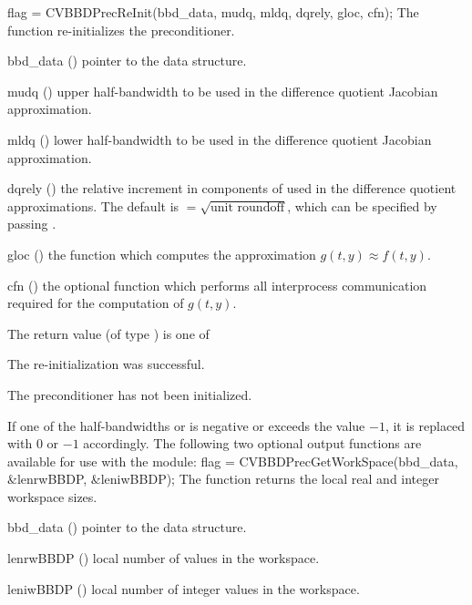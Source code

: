 {
  flag = CVBBDPrecReInit(bbd\_data, mudq, mldq, dqrely, gloc, cfn);
}
{
  The function  re-initializes the {\cvbbdpre} preconditioner.
}
{
  \begin{args}
  \item[bbd\_data] ()
    pointer to the {\cvbbdpre} data structure.
  \item[mudq] ()
    upper half-bandwidth to be used in the difference quotient Jacobian approximation.
  \item[mldq] ()
    lower half-bandwidth to be used in the difference quotient Jacobian approximation.
  \item[dqrely] ()
    the relative increment in components of  used in the difference quotient
    approximations.  The default is  $= \sqrt{\text{unit roundoff}}$,
    which can be specified by passing .
  \item[gloc] ()
    the {\C} function which computes the approximation $g(t,y) \approx f(t,y)$. 
  \item[cfn] ()
    the optional {\C} function which performs all interprocess communication required for
    the computation of $g(t,y)$.
  \end{args}
}
{
  The return value  (of type ) is one of
  \begin{args}
  \item[\Id{CVSPBCG\_SUCCESS}] 
    The {\cvspbcg} re-initialization was successful.
    \item[\Id{CVBBDPRE\_PDATA\_NULL}]
    The {\cvbbdpre} preconditioner has not been initialized.
  \end{args}
}
{
  If one of the half-bandwidths  or  is negative or
  exceeds the value $-1$, it is replaced with 0 or
  $-1$ accordingly.
}
The following two optional output functions are available for use with
the {\cvbbdpre} module:
{
  flag = CVBBDPrecGetWorkSpace(bbd\_data, \&lenrwBBDP, \&leniwBBDP);
}
{
  The function  returns the local
  {\cvbbdpre} real and integer workspace sizes.
}
{
  \begin{args}[lenrwBBDP]
  \item[bbd\_data] ()
    pointer to the {\cvbbdpre} data structure.
  \item[lenrwBBDP] ()
    local number of  values in the {\cvbbdpre} workspace.
  \item[leniwBBDP] ()
    local number of integer values in the {\cvbbdpre} workspace.
  \end{args}
}
